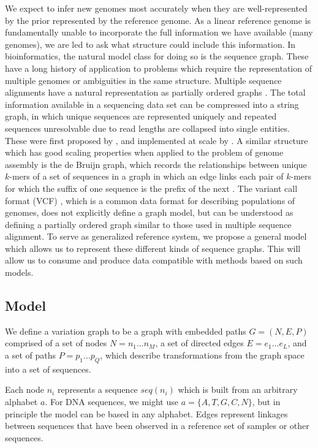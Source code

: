 \documentclass{article}
\begin{document}
We expect to infer new genomes most accurately when they are well-represented by the prior represented by the reference genome.
As a linear reference genome is fundamentally unable to incorporate the full information we have available (many genomes), we are led to ask what structure could include this information.
In bioinformatics, the natural model class for doing so is the sequence graph.
These have a long history of application to problems which require the representation of multiple genomes or ambiguities in the same structure.
Multiple sequence alignments have a natural representation as partially ordered graphs \cite{lee2002POA}.
The total information available in a sequencing data set can be compressed into a string graph, in which unique sequences are represented uniquely and repeated sequences unresolvable due to read lengths are collapsed into single entities.
These were first proposed by \cite{myers2005}, and implemented at scale by \cite{simpson2010}.
A similar structure which has good scaling properties when applied to the problem of genome assembly is the de Bruijn graph, which records the relationships between unique $k$-mers of a set of sequences in a graph in which an edge links each pair of $k$-mers for which the suffix of one sequence is the prefix of the next \cite{iqbal2012}.
The variant call format (VCF) \cite{danecek2011}, which is a common data format for describing populations of genomes, does not explicitly define a graph model, but can be understood as defining a partially ordered graph similar to those used in multiple sequence alignment. 
To serve as generalized reference system, we propose a general model which allows us to represent these different kinds of sequence graphs.
This will allow us to consume and produce data compatible with methods based on such models.

\subsection{Model}

We define a variation graph to be a graph with embedded paths $G = ( N, E, P )$ comprised of a set of nodes $N = n_1 \ldots n_M$, a set of directed edges $E = e_1 \ldots e_L$, and a set of paths $P = p_1 \ldots p_Q$, which describe transformations from the graph space into a set of sequences.

Each node $n_i$ represents a sequence $seq(n_i)$ which is built from an arbitrary alphabet $a$.
For DNA sequences, we might use $a = \{ A, T, G, C, N \}$, but in principle the model can be based in any alphabet.
Edges represent linkages between sequences that have been observed in a reference set of samples or other sequences.
\end{document}
